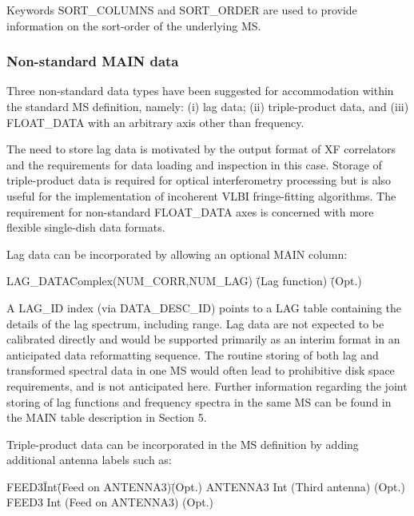 \documentclass{article}
\begin{document}
 Keywords SORT\_COLUMNS and SORT\_ORDER are used to provide
information on the sort-order of the underlying MS.

\subsubsection{Non-standard MAIN data}

Three non-standard data types have been suggested for accommodation
within the standard MS definition, namely: (i) lag data; (ii)
triple-product data, and (iii) FLOAT\_DATA with an arbitrary axis other
than frequency.

The need to store lag data is motivated by the output format of XF
correlators and the requirements for data loading and inspection in
this case. Storage of triple-product data is required for optical
interferometry processing but is also useful for the implementation of
incoherent VLBI fringe-fitting algorithms. The requirement for
non-standard FLOAT\_DATA axes is concerned with more flexible
single-dish data formats.

Lag data can be incorporated by allowing an optional MAIN column:

\begin{tabbing}
LAG\_DATA\quad\quad \= Complex(NUM\_CORR,NUM\_LAG) \quad\quad \= 
(Lag function) \quad\quad \= (Opt.) \\
\end{tabbing}

A LAG\_ID index (via DATA\_DESC\_ID) points to a LAG table containing
the details of the lag spectrum, including range. Lag data are not
expected to be calibrated directly and would be supported primarily as
an interim format in an anticipated data reformatting sequence. The
routine storing of both lag and transformed spectral data in one MS
would often lead to prohibitive disk space requirements, and is not
anticipated here. Further information regarding the joint storing of
lag functions and frequency spectra in the same MS can be found in the
MAIN table description in Section 5.

Triple-product data can be incorporated in the MS definition by adding
additional antenna labels such as:

\begin{tabbing}
FEED3\quad\quad\quad\quad  \= Int\quad\quad  \=
(Feed on ANTENNA3)\quad\quad \= (Opt.)\quad\quad \kill
ANTENNA3 \> Int \> (Third antenna) \> (Opt.) \\
FEED3    \> Int  \> (Feed on ANTENNA3) \> (Opt.) \\
\end{tabbing}
\end{document}
